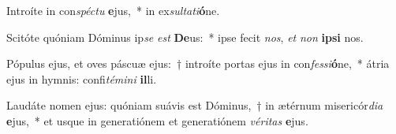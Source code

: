 \item Introíte in con\textit{spéc}\textit{tu} \textbf{e}jus,~* in ex\textit{sul}\textit{ta}\textit{ti}\textbf{ó}ne.
\item Scitóte quóniam Dóminus ip\textit{se} \textit{est} \textbf{De}us:~* ipse fecit \textit{nos}, \textit{et} \textit{non} \textbf{ip}\textbf{si} nos.
\item Pópulus ejus, et oves páscuæ ejus:~† introíte portas ejus in con\textit{fes}\textit{si}\textbf{ó}ne,~* átria ejus in hymnis: confi\textit{té}\textit{mi}\textit{ni} \textbf{il}li.
\item Laudáte nomen ejus: quóniam suávis est Dóminus,~† in ætérnum misericór\textit{di}\textit{a} \textbf{e}jus,~* et usque in generatiónem et generatiónem \textit{vé}\textit{ri}\textit{tas} \textbf{e}jus.
